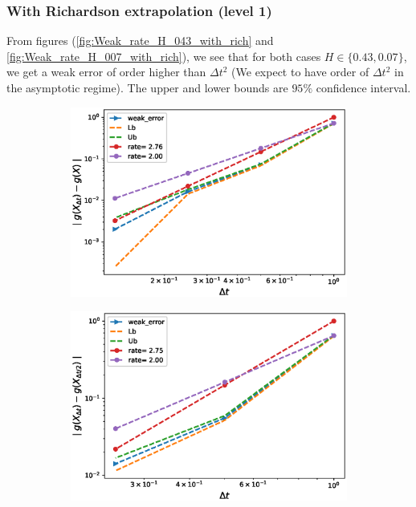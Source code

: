 \documentclass[11pt]{article}
\begin{document}
\subsubsection*{With Richardson extrapolation (level 1)}
From figures (\ref{fig:Weak_rate_H_043_with_rich} and \ref{fig:Weak_rate_H_007_with_rich}), we see that for both cases $H \in \{0.43,0.07\}$, we get a weak error of order higher than  $\Delta t^2$ (We expect to have order of $\Delta t^2$ in the asymptotic regime). The upper and lower bounds are $95\%$ confidence interval.
\begin{figure}[h!]
	\centering
	\begin{subfigure}{.4\textwidth}
		\centering
		\includegraphics[width=1\linewidth]{./figures/rBergomi_weak_error_rates/with_richardson/H_043/weak_convergence_order_Bergomi_H_043_K_1_M_10_6_CI_richardson_relative}
		\caption{}
		\label{fig:sub3}
	\end{subfigure}%
	\begin{subfigure}{.4\textwidth}
		\centering
		\includegraphics[width=1\linewidth]{./figures/rBergomi_weak_error_rates/with_richardson/H_043/weak_convergence_order_differences_Bergomi_H_043_K_1_M_10_6_CI_richardson_relative}
		\caption{}
		\label{fig:sub4}
	\end{subfigure}
	

\end{figure}
\end{document}

